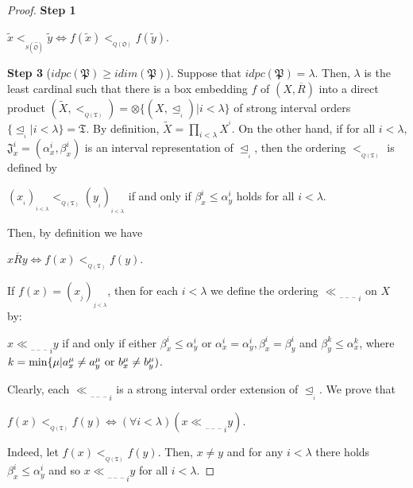 \documentclass{article}
\theoremstyle{definition}
\begin{document}
\begin{proof}{\bf Step 1}
\begin{center}
$\widetilde{x} <_{_{S(\widehat{\mathfrak{O}})}}\widetilde{y}\Leftrightarrow 
f(\widetilde{x})<_{_{Q(\mathfrak{O})}} f(\widetilde{y})$.
\end{center}
\par\smallskip\par\noindent
{\bf Step 3} ($idpc(\mathfrak{P})\geq idim(\mathfrak{P})$).
Suppose that $idpc(\mathfrak{P})=\lambda$.
Then,
$\lambda$ is
the least cardinal such that there is a box embedding $f$ of $(X,\overline{R})$ into a direct product 
$(\widetilde{X},<_{_{Q(\mathfrak{T})}})=\otimes\{(X,\unlhd_{_i})\vert i<\lambda\}$
of strong interval orders $\{\unlhd_{_i}\vert i<\lambda\}=\mathfrak{T}$.
By definition, $\widetilde{X}=
\displaystyle\prod_{i<\lambda}X^{^i}$. On the other hand, if for all $i<\lambda$,
$\mathfrak{J}_x^i=(\alpha_{x}^{i},\beta_{x}^{i})$
is an interval representation of $\unlhd_{_i}$, then the ordering
$<_{_{Q(\mathfrak{T})}}$ is defined by 
\begin{center}
$(x_{_i})_{_{i<\lambda}}<_{_{Q(\mathfrak{T})}}(y_{_i})_{_{i<\lambda}}$
if and only if 
$\beta_{x}^{i}\leq \alpha_{y}^{i}$ holds for all $i<\lambda$.
\end{center}
Then, by definition we have 
\begin{center}
$x\overline{R}y\Leftrightarrow f(x)<_{_{Q(\mathfrak{T})}}f(y)$.
\end{center}
If $f(x)=(x_{_j})_{_{j<\lambda}}$, then
for each $i<\lambda$ we define the ordering ${\ll\!\!\!\!\!\!\!_{_{{-\!\!\!-\!\!\!-}}}}_{i}$
on $X$ by:
\begin{center}
 $x {\ll\!\!\!\!\!\!\!_{_{{-\!\!\!-\!\!\!-}}}}_{i}y$ if and only if either
$\beta_{x}^{i}\leq \alpha_{y}^{i}$ or $\alpha_{x}^{i}=\alpha_{y}^{i}, \beta_{x}^{i}=\beta_{y}^{i}$ and 
$\beta_{y}^{k}\leq \alpha_{x}^{k}$,
where 
$k=\min\{\mu\vert a_{x}^{\mu}\neq a_{y}^{\mu}\ {\rm or}\ b_{x}^{\mu}\neq b_{y}^{\mu})$.
\end{center}
Clearly, each ${\ll\!\!\!\!\!\!\!_{_{{-\!\!\!-\!\!\!-}}}}_{i}$ is a strong interval order extension of $\unlhd_{_i}$.
We prove that
\begin{center}
 $f(x)<_{_{Q(\mathfrak{T})}}f(y)\Leftrightarrow (\forall i<\lambda) (x {\ll\!\!\!\!\!\!\!_{_{{-\!\!\!-\!\!\!-}}}}_{i} y)$. 
 \end{center}
 Indeed, let $f(x)<_{_{Q(\mathfrak{T})}}f(y)$. Then, $x\neq y$ and for any $i<\lambda$ there holds 
$\beta_{x}^{i}\leq \alpha_{y}^{i}$ 
and so $x {\ll\!\!\!\!\!\!\!_{_{{-\!\!\!-\!\!\!-}}}}_{i} y$
for all $i<\lambda$. 

\end{proof}
\end{document}
